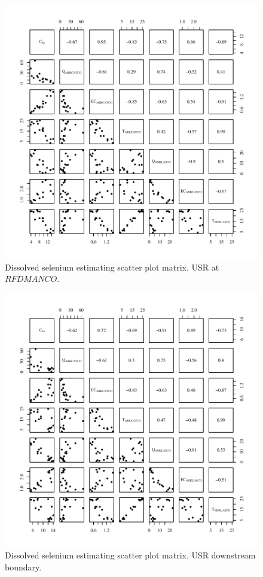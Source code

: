 \begin{figure}[htbp]
	\begin{center}
	\includegraphics[width=6in]{"Figures/Results_USR/Conc Model Full PairsU167"}
	\caption{Dissolved selenium estimating scatter plot matrix.  USR at $RFDMANCO$.}
	\end{center}
\end{figure}

\begin{figure}[htbp]
	\begin{center}
	\includegraphics[width=6in]{"Figures/Results_USR/Conc Model Full PairsU201"}
	\caption{Dissolved selenium estimating scatter plot matrix.  USR downstream boundary.}
	\end{center}
\end{figure}

